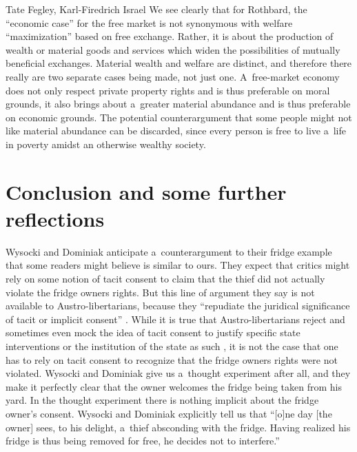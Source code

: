 \begin{artengenv2auth}{Tate Fegley, Karl-Firedrich Israel}
We see clearly that for Rothbard, the ``economic case'' for the free market is not synonymous with welfare ``maximization'' based on free exchange. Rather, it is about the production of wealth or material goods and services which widen the possibilities of mutually beneficial exchanges. Material wealth and welfare are distinct, and therefore there really are two separate cases being made, not just one. A~free-market economy does not only respect private property rights and is thus preferable on moral grounds, it also brings about a~greater material abundance and is thus preferable on economic grounds. The potential counterargument that some people might not like material abundance can be discarded, since every person is free to live a~life in poverty amidst an otherwise wealthy society.



\section{Conclusion and some further reflections}

Wysocki and Dominiak 
\parencite*[][pp.58–59]{wysocki_how_2023} %
 anticipate a~counterargument to their fridge example that some readers might believe is similar to ours. They expect that critics might rely on some notion of tacit consent to claim that the thief did not actually violate the fridge owners rights. But this line of argument they say is not available to Austro-libertarians, because they ``repudiate the juridical significance of tacit or implicit consent'' 
\parencite[][p.58]{wysocki_how_2023}. %
 While it is true that Austro-libertarians reject and sometimes even mock the idea of tacit consent to justify specific state interventions or the institution of the state as such 
\parencite[][]{hoppe_economics_2006}, %
 it is not the case that one has to rely on tacit consent to recognize that the fridge owners rights were not violated. Wysocki and Dominiak give us a~thought experiment after all, and they make it perfectly clear that the owner welcomes the fridge being taken from his yard. In the thought experiment there is nothing implicit about the fridge owner's consent. Wysocki and Dominiak 
\parencite*[][p.58]{wysocki_how_2023} %
 explicitly tell us that ``[o]ne day [the owner] sees, to his delight, a~thief absconding with the fridge. Having realized his fridge is thus being removed for free, he decides not to interfere.''




\end{artengenv2auth}
